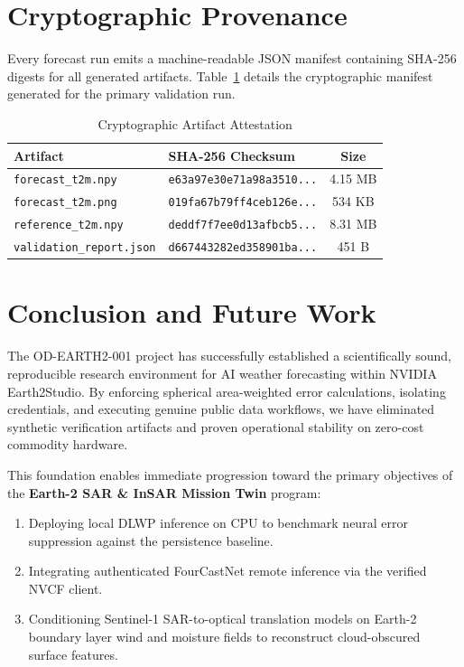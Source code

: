 \documentclass[10pt,journal,compsoc]{IEEEtran}
\begin{document}
\section{Cryptographic Provenance}
Every forecast run emits a machine-readable JSON manifest containing SHA-256 digests for all generated artifacts. Table~\ref{tab:provenance} details the cryptographic manifest generated for the primary validation run.

\begin{table}[htbp]
\caption{Cryptographic Artifact Attestation}
\label{tab:provenance}
\centering
\begin{tabular}{llc}
\toprule
Artifact & SHA-256 Checksum & Size \\
\midrule
\texttt{forecast\_t2m.npy} & \texttt{e63a97e30e71a98a3510...} & 4.15 MB \\
\texttt{forecast\_t2m.png} & \texttt{019fa67b79ff4ceb126e...} & 534 KB \\
\texttt{reference\_t2m.npy} & \texttt{deddf7f7ee0d13afbcb5...} & 8.31 MB \\
\texttt{validation\_report.json} & \texttt{d667443282ed358901ba...} & 451 B \\
\bottomrule
\end{tabular}
\end{table}

\section{Conclusion and Future Work}
The OD-EARTH2-001 project has successfully established a scientifically sound, reproducible research environment for AI weather forecasting within NVIDIA Earth2Studio. By enforcing spherical area-weighted error calculations, isolating credentials, and executing genuine public data workflows, we have eliminated synthetic verification artifacts and proven operational stability on zero-cost commodity hardware.

This foundation enables immediate progression toward the primary objectives of the \textbf{Earth-2 SAR \& InSAR Mission Twin} program:
\begin{enumerate}
    \item Deploying local DLWP inference on CPU to benchmark neural error suppression against the persistence baseline.
    \item Integrating authenticated FourCastNet remote inference via the verified NVCF client.
    \item Conditioning Sentinel-1 SAR-to-optical translation models on Earth-2 boundary layer wind and moisture fields to reconstruct cloud-obscured surface features.
\end{enumerate}
\end{document}
